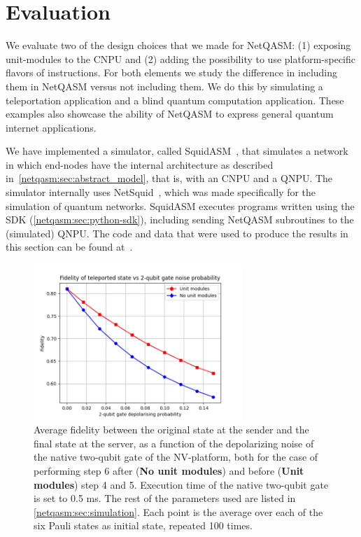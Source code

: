 \section{Evaluation}
\label{netqasm:sec:evaluation}
We evaluate two of the design choices that we made for \ac{NetQASM}:
    (1) exposing unit-modules to the \ac{CNPU} and
    (2) adding the possibility to use platform-specific flavors of instructions.
For both elements we study the difference in including them in \ac{NetQASM} versus not including them.
We do this by simulating a teleportation application and a blind quantum computation application.
These examples also showcase the ability of \ac{NetQASM} to express general quantum internet applications.

We have implemented a simulator, called SquidASM~\cite{git_squidasm}, that simulates a network in which end-nodes have the internal architecture as described in~\cref{netqasm:sec:abstract_model}, that is, with an \ac{CNPU} and a \ac{QNPU}.
The simulator internally uses NetSquid~\cite{netsquid}, which was made specifically for the simulation of quantum networks.
SquidASM executes programs written using the SDK (\cref{netqasm:sec:python-sdk}), including sending \ac{NetQASM} subroutines to the (simulated) \ac{QNPU}.
The code and data that were used to produce the results in this section can be found at~\cite{git_netqasm_paper_data}.

\begin{figure}[t]
    \centering
    \includegraphics[width=0.7\textwidth]{figures/netqasm/plots/paper_teleport_sweep_gate_noise.png}
    \caption{
        Average fidelity between the original state at the sender and
        the final state at the server, as a function of the depolarizing noise
        of the native two-qubit gate of the NV-platform, both for the case of
        performing step 6 after (\textbf{No unit modules}) and before
        (\textbf{Unit modules}) step 4 and 5. Execution time of the native
        two-qubit gate is set to 0.5 ms. The rest of the parameters used are
        listed in \cref{netqasm:sec:simulation}. Each point is the average over each of
        the six Pauli states as initial state, repeated 100 times.}
    \label{netqasm:fig:sweep_gate_noise}
\end{figure}

